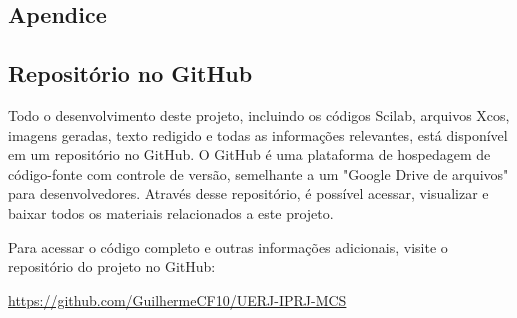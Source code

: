 \begin{titlepage}

    \section{Apendice}

    \subsection{Repositório no GitHub}

    Todo o desenvolvimento deste projeto, incluindo os códigos Scilab, arquivos Xcos, imagens geradas, texto redigido e todas as informações relevantes, está disponível em um repositório no GitHub. O GitHub é uma plataforma de hospedagem de código-fonte com controle de versão, semelhante a um "Google Drive de arquivos" para desenvolvedores. Através desse repositório, é possível acessar, visualizar e baixar todos os materiais relacionados a este projeto.

    Para acessar o código completo e outras informações adicionais, visite o repositório do projeto no GitHub:
    \begin{center}
        \url{https://github.com/GuilhermeCF10/UERJ-IPRJ-MCS}
    \end{center}

\end{titlepage}
